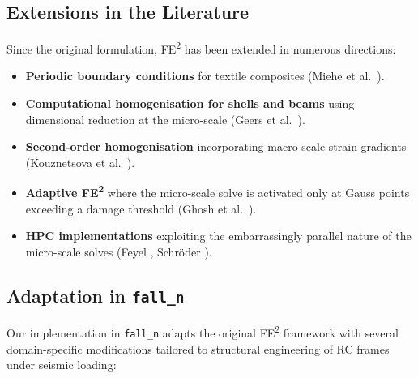\subsection{Extensions in the Literature}

Since the original formulation, FE\textsuperscript{2} has been
extended in numerous directions:

\begin{itemize}
  \item \textbf{Periodic boundary conditions} for textile composites
    (Miehe et al.\ \cite{Miehe2002}).
  \item \textbf{Computational homogenisation for shells and beams}
    using dimensional reduction at the micro-scale
    (Geers et al.\ \cite{Geers2010}).
  \item \textbf{Second-order homogenisation} incorporating macro-scale
    strain gradients (Kouznetsova et al.\ \cite{Kouznetsova2004}).
  \item \textbf{Adaptive FE\textsuperscript{2}} where the micro-scale
    solve is activated only at Gauss points exceeding a damage
    threshold (Ghosh et al.\ \cite{Ghosh2001}).
  \item \textbf{HPC implementations} exploiting the embarrassingly
    parallel nature of the micro-scale solves (Feyel \cite{Feyel2003},
    Schröder \cite{Schroeder2014}).
\end{itemize}

\subsection{Adaptation in \texttt{fall\_n}}
\label{sec:ms-fe2-adaptation}

Our implementation in \texttt{fall\_n} adapts the original
FE\textsuperscript{2} framework with several domain-specific
modifications tailored to structural engineering of RC frames under
seismic loading:

